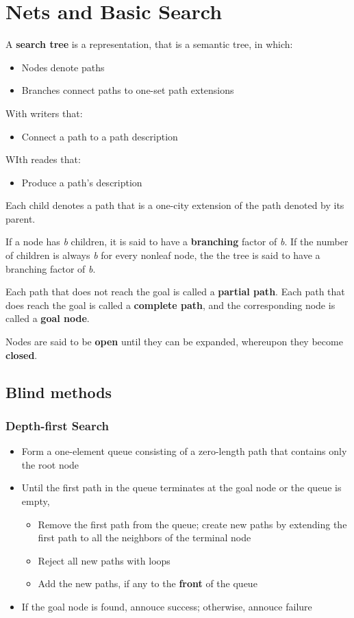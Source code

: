 \documentclass{article}
\begin{document}
\section{Nets and Basic Search}

A \textbf{search tree} is a representation, that is a semantic tree, in which:
\begin{itemize}
  \item Nodes denote paths
  \item Branches connect paths to one-set path extensions
\end{itemize}
With writers that:
\begin{itemize}
  \item Connect a path to a path description
\end{itemize}
WIth reades that:
\begin{itemize}
  \item Produce a path's description
\end{itemize}

Each child denotes a path that is a one-city extension of the path denoted by its parent.

If a node has \textit{b} children, it is said to have a \textbf{branching}
factor of \textit{b}. If the number of children is always \textit{b}
for every nonleaf node, the the tree is said to have a branching 
factor of \textit{b}.

Each path that does not reach the goal is called a \textbf{partial path}.
Each path that does reach the goal is called a \textbf{complete path},
and the corresponding node is called a \textbf{goal node}.

Nodes are said to be \textbf{open} until they can be expanded,
whereupon they become \textbf{closed}.

\subsection{Blind methods}

\subsubsection{Depth-first Search}

\begin{itemize}
  \item Form a one-element queue consisting of a zero-length path
    that contains only the root node
  \item Until the first path in the queue terminates at the goal node or the queue is empty,
    \begin{itemize}
      \item Remove the first path from the queue; create new paths
        by extending the first path to all the neighbors of the 
        terminal node
      \item Reject all new paths with loops
      \item Add the new paths, if any to the \textbf{front} of the queue
    \end{itemize}
  \item If the goal node is found, annouce success; otherwise, annouce 
    failure
\end{itemize}
\end{document}

